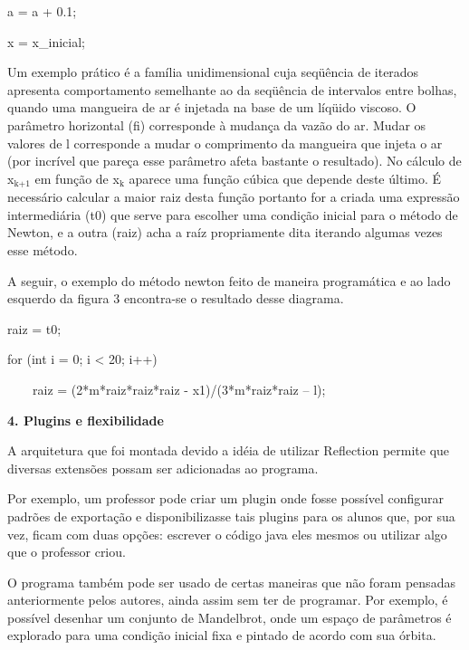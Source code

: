 \documentclass[a4paper,12pt]{article}
\newcommand\textsubscript[1]{\ensuremath{{}_{\text{#1}}}}
\begin{document}
{
 a = a + 0.1;}

{
 x = x\_inicial;}

{
 Um exemplo pr\'atico \'e a fam\'ilia unidimensional cuja seq\"u\^encia
de iterados apresenta comportamento semelhante ao da seq\"u\^encia de
intervalos entre bolhas, quando uma mangueira de ar \'e injetada na
base de um l\'iq\"uido viscoso. O par\^ametro
{\textquotedbl}horizontal{\textquotedbl} (fi) corresponde \`a
mudan\c{c}a da vaz\~ao do ar. Mudar os valores de l corresponde a mudar
o comprimento da mangueira que injeta o ar (por incr\'ivel que
pare\c{c}a esse par\^ametro afeta bastante o resultado).\newline
 No c\'alculo de x\textmd{\textsubscript{k+1}} em fun\c{c}\~ao de
x\textsubscript{k} aparece uma fun\c{c}\~ao c\'ubica que depende deste
\'ultimo. \'E necess\'ario calcular a maior raiz desta fun\c{c}\~ao
portanto for a criada uma express\~ao intermedi\'aria (t0) que serve
para escolher uma condi\c{c}\~ao inicial para o m\'etodo de Newton, e a
outra (raiz) acha a ra\'iz propriamente dita iterando algumas vezes
esse m\'etodo.}

{
 A seguir, o exemplo do m\'etodo newton feito de maneira program\'atica
e ao lado esquerdo da figura 3 encontra{}-se o resultado desse
diagrama.}

{
 raiz = t0;}

{
 for (int i = 0; i {\textless} 20; i++)}

{
  \ \ \ \ raiz = (2*m*raiz*raiz*raiz {}- x1)/(3*m*raiz*raiz {--} l);}

{\bfseries
4. Plugins e flexibilidade}

{
A arquitetura que foi montada devido a id\'eia de utilizar Reflection
permite que diversas extens\~oes possam ser adicionadas ao programa.}

{
 Por exemplo, um professor pode criar um plugin onde fosse poss\'ivel
configurar padr\~oes de exporta\c{c}\~ao e disponibilizasse tais
plugins para os alunos que, por sua vez, ficam com duas op\c{c}\~oes:
escrever o c\'odigo java eles mesmos ou utilizar algo que o professor
criou.}

{
 O programa tamb\'em pode ser usado de certas maneiras que n\~ao foram
pensadas anteriormente pelos autores, ainda assim sem ter de programar.
Por exemplo, \'e poss\'ivel desenhar um conjunto de Mandelbrot, onde um
espa\c{c}o de par\^ametros \'e explorado para uma condi\c{c}\~ao
inicial fixa e pintado de acordo com sua \'orbita.}
\end{document}
